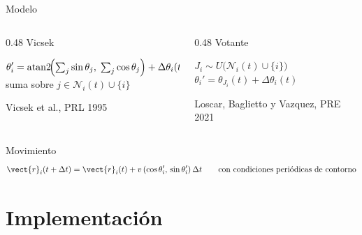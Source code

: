 \documentclass[aspectratio=169]{beamer}
\begin{document}
\begin{frame}{Modelo}
  \vspace{0.4em}
  \begin{columns}[T,onlytextwidth]
    \begin{column}{0.48\textwidth}
      {\color{structure}\large Vicsek}\par
      \vspace{0.55em}
      \begin{minipage}[t][0.27\textheight][t]{\linewidth}
        \centering
        \(
          \displaystyle
          \theta_i'=\operatorname{atan2}\!\Bigl({\textstyle\sum_{j}}\sin\theta_j,\;
          {\textstyle\sum_{j}}\cos\theta_j\Bigr)+\Delta\theta_i(t)
        \)\\[0.4em]
        {\scriptsize suma sobre \(j\in\mathcal{N}_i(t)\cup\{i\}\)}\par
        \vfill
        {\tiny Vicsek et al., PRL 1995}
      \end{minipage}
    \end{column}
    \begin{column}{0.48\textwidth}
      {\color{structure}\large Votante}\par
      \vspace{0.55em}
      \begin{minipage}[t][0.27\textheight][t]{\linewidth}
        \centering
        \(
          \displaystyle
          J_i\sim U\bigl(\mathcal{N}_i(t)\cup\{i\}\bigr)
        \)\\[0.45em]
        \(
          \displaystyle
          \theta_i'=\theta_{J_i}(t)+\Delta\theta_i(t)
        \)\par
        \vfill
        {\tiny Loscar, Baglietto y Vazquez, PRE 2021}
      \end{minipage}
    \end{column}
  \end{columns}

  \vspace{0.2em}
  \begin{block}{Movimiento}
    \vspace{-0.55em}
    \[
      \vect{r}_i(t+\Delta t)=
      \vect{r}_i(t)+v\,(\cos\theta_i',\,\sin\theta_i')\,\Delta t
      \qquad
      \text{con condiciones periódicas de contorno}
    \]
  \end{block}
\end{frame}

\section{Implementación}
\end{document}
